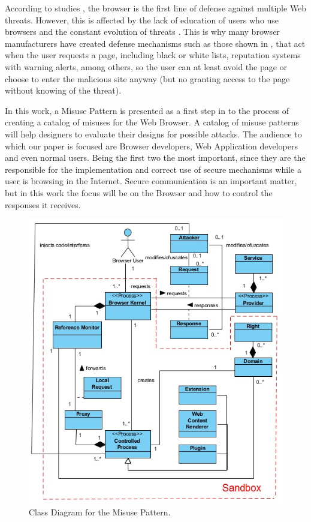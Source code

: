 \documentclass{sig-alternate-05-2015}
\begin{document}
According to studies \cite{browSecPhish,Labs2013,rowSecSEMBlock}, the browser is the first line of defense against multiple Web threats. However, this is affected by the lack of education of users who use browsers and the constant evolution of threats \cite{browSecPhish}. This is why many browser manufacturers have created defense mechanisms such as those shown in \cite{Drake2011}, that act when the user requests a page, including black or white lists, reputation systems \cite{Rajab2013} with warning alerts, among others, so the user can at least avoid the page or choose to enter the malicious site anyway (but no granting access to the page without knowing of the threat).

In this work, a Misuse Pattern is presented as a first step in to the process of creating a catalog of misuses for the Web Browser. A catalog of misuse patterns will help designers to evaluate their designs for possible attacks. The audience to which our paper is focused are Browser developers, Web Application developers and even normal users. Being the first two the most important, since they are the responsible for the implementation and correct use of secure mechanisms while a user is browsing in the Internet. Secure communication is an important matter, but in this work the focus will be on the Browser and how to control the responses it receives.

\begin{figure}[h!t]
  \centering
  \includegraphics[scale=0.8]{figures/patronMisuse_v8.jpg}
  \caption{Class Diagram for the Misuse Pattern.}
  \label{fig:BIMisuse}
\end{figure}
\end{document}
